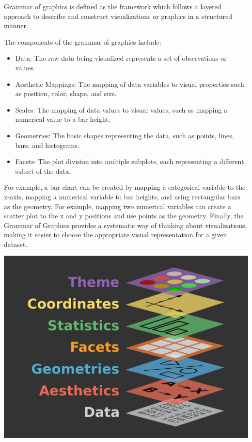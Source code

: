 \documentclass[print]{nuthesis}
\providecommand{\tightlist}{%
  \setlength{\itemsep}{0pt}\setlength{\parskip}{0pt}}
\begin{document}
Grammar of graphics is defined as the framework which follows a layered approach to describe and construct visualizations or graphics in a structured manner.

The components of the grammar of graphics include:

\begin{itemize}
\tightlist
\item
  Data: The raw data being visualized represents a set of observations or values.
\item
  Aesthetic Mappings: The mapping of data variables to visual properties such as position, color, shape, and size.
\item
  Scales: The mapping of data values to visual values, such as mapping a numerical value to a bar height.
\item
  Geometries: The basic shapes representing the data, such as points, lines, bars, and histograms.
\item
  Facets: The plot division into multiple subplots, each representing a different subset of the data.
\end{itemize}

For example, a bar chart can be created by mapping a categorical variable to the x-axis, mapping a numerical variable to bar heights, and using rectangular bars as the geometry. For example, mapping two numerical variables can create a scatter plot to the x and y positions and use points as the geometry. Finally, the Grammar of Graphics provides a systematic way of thinking about visualizations, making it easier to choose the appropriate visual representation for a given dataset.

\begin{center}
\includegraphics[width=\textwidth]{figure/gglayers}
\end{center}
\end{document}
